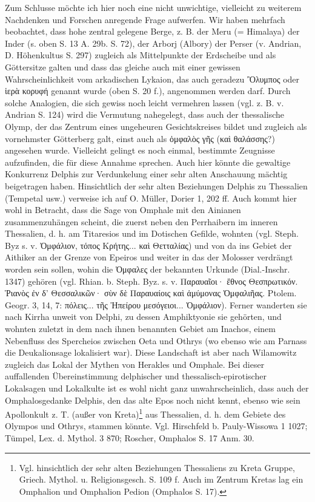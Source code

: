 \documentclass[a4paper, 11pt, oneside]{article}
\begin{document}
Zum Schlusse möchte ich hier noch eine nicht unwichtige, vielleicht zu weiterem Nachdenken und Forschen anregende Frage aufwerfen. Wir haben mehrfach beobachtet, dass hohe zentral gelegene Berge, z. B. der Meru (= Himalaya) der Inder (s. oben S. 13 A. 29b. S. 72), der Arborj (Albory) der Perser (v. Andrian, D. Höhenkultus S. 297) zugleich als Mittelpunkte der Erdscheibe und als Göttersitze galten und dass das gleiche auch mit einer gewissen Wahrscheinlichkeit vom arkadischen Lykaion, das auch geradezu Ὂλυμπος oder ἱερὰ κορυφή genannt wurde (oben S. 20 f.), angenommen werden darf. Durch solche Analogien, die sich gewiss noch leicht vermehren lassen (vgl. z. B. v. Andrian S. 124) wird die Vermutung nahegelegt, dass auch der thessalische Olymp, der das Zentrum eines ungeheuren Gesichtskreises bildet und zugleich als vornehmster Götterberg galt, einst auch als ὀμφαλὸς γῆς (καὶ θαλάσσης?) angesehen wurde. Vielleicht gelingt es noch einmal, bestimmte Zeugnisse aufzufinden, die für diese Annahme sprechen. Auch hier könnte die gewaltige Konkurrenz Delphis zur Verdunkelung einer sehr alten Anschauung mächtig beigetragen haben. Hinsichtlich der sehr alten Beziehungen Delphis zu Thessalien (Tempetal usw.) verweise ich auf O. Müller, Dorier 1, 202 ff. Auch kommt hier wohl in Betracht, dass die Sage von Omphale mit den Ainianen zusammenzuhängen scheint, die zuerst neben den Perrhaibern im inneren Thessalien, d. h. am Titaresios und im Dotischen Gefilde, wohnten (vgl. Steph. Byz s. v. Ὀμφάλιον, τόπος Κρήτης... καὶ Θετταλίας) und von da ins Gebiet der Aithiker an der Grenze von Epeiros und weiter in das der Molosser verdrängt worden sein sollen, wohin die Ὀμφαλες der bekannten Urkunde (Dial.-Inschr. 1347) gehören (vgl. Rhian. b. Steph. Byz. s. v. Παραυαῖοι· ἔθνος Θεσπρωτικόν. Ῥιανὸς ἐν δ' Θεσσαλικῶν· σὺν δὲ Παραυαίοις καὶ ἀμύμονας Ὀμφαλιῆας. Ptolem. Geogr. 3, 14, 7: πόλεις... τῆς Ἠπείρου μεσόγειοι... Ὀμφάλιον). Ferner wanderten sie nach Kirrha unweit von Delphi, zu dessen Amphiktyonie sie gehörten, und wohnten zuletzt in dem nach ihnen benannten Gebiet am Inachos, einem Nebenfluss des Spercheios zwischen Oeta und Othrys (wo ebenso wie am Parnass die Deukalionsage lokalisiert war). Diese Landschaft ist aber nach Wilamowitz zugleich das Lokal der Mythen von Herakles und Omphale. Bei dieser auffallenden Übereinstimmung delphischer und thessalisch-epirotischer Lokalsagen und Lokalkulte ist es wohl nicht ganz unwahrscheinlich, dass auch der Omphalosgedanke Delphis, den das alte Epos noch nicht kennt, ebenso wie sein Apollonkult z. T. (außer von Kreta)\footnote{Vgl. hinsichtlich der sehr alten Beziehungen Thessaliens zu Kreta Gruppe, Griech. Mythol. u. Religionsgesch. S. 109 f. Auch im Zentrum Kretas lag ein Omphalion und Omphalion Pedion (Omphalos S. 17).} aus Thessalien, d. h. dem Gebiete des Olympos und Othrys, stammen könnte. Vgl. Hirschfeld b. Pauly-Wissowa 1 1027; Tümpel, Lex. d. Mythol. 3 870; Roscher, Omphalos S. 17 Anm. 30.
\end{document}
